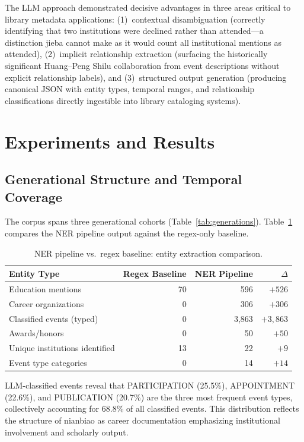\documentclass[review]{elsarticle}
\begin{document}
The LLM approach demonstrated decisive advantages in three areas critical to library metadata applications: (1)~contextual disambiguation (correctly identifying that two institutions were declined rather than attended---a distinction jieba cannot make as it would count all institutional mentions as attended), (2)~implicit relationship extraction (surfacing the historically significant Huang--Peng Shilu collaboration from event descriptions without explicit relationship labels), and (3)~structured output generation (producing canonical JSON with entity types, temporal ranges, and relationship classifications directly ingestible into library cataloging systems).

\section{Experiments and Results}
\label{sec:results}

\subsection{Generational Structure and Temporal Coverage}

The corpus spans three generational cohorts (Table~\ref{tab:generations}). Table~\ref{tab:ner_comparison} compares the NER pipeline output against the regex-only baseline.

\begin{table}[ht]
\centering
\caption{NER pipeline vs.\ regex baseline: entity extraction comparison.}
\label{tab:ner_comparison}
\begin{tabular}{lrrr}
\toprule
Entity Type & Regex Baseline & NER Pipeline & $\Delta$ \\
\midrule
Education mentions & 70 & 596 & $+526$ \\
Career organizations & 0 & 306 & $+306$ \\
Classified events (typed) & 0 & 3,863 & $+3,863$ \\
Awards/honors & 0 & 50 & $+50$ \\
Unique institutions identified & 13 & 22 & $+9$ \\
Event type categories & 0 & 14 & $+14$ \\
\bottomrule
\end{tabular}
\end{table}

LLM-classified events reveal that PARTICIPATION (25.5\%), APPOINTMENT (22.6\%), and PUBLICATION (20.7\%) are the three most frequent event types, collectively accounting for 68.8\% of all classified events. This distribution reflects the structure of nianbiao as career documentation emphasizing institutional involvement and scholarly output.
\end{document}
